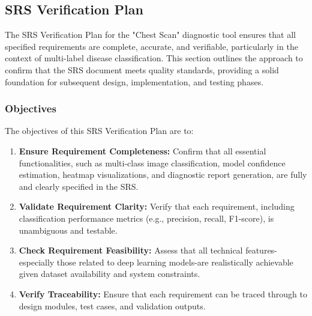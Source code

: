 \documentclass[12pt, titlepage]{article}
\begin{document}
\pagebreak

\subsection{SRS Verification Plan}


The SRS Verification Plan for the "Chest Scan" diagnostic tool ensures that all specified requirements are complete, accurate, and verifiable, particularly in the context of multi-label disease classification. This section outlines the approach to confirm that the SRS document meets quality standards, providing a solid foundation for subsequent design, implementation, and testing phases.

\subsubsection{Objectives}
The objectives of this SRS Verification Plan are to:
\begin{enumerate}
  \item \textbf{Ensure Requirement Completeness:} Confirm that all essential functionalities, such as multi-class image classification, model confidence estimation, heatmap visualizations, and diagnostic report generation, are fully and clearly specified in the SRS.
  \item \textbf{Validate Requirement Clarity:} Verify that each requirement, including classification performance metrics (e.g., precision, recall, F1-score), is unambiguous and testable.
  \item \textbf{Check Requirement Feasibility:} Assess that all technical features-especially those related to deep learning models-are realistically achievable given dataset availability and system constraints.
  \item \textbf{Verify Traceability:} Ensure that each requirement can be traced through to design modules, test cases, and validation outputs.
\end{enumerate}
\end{document}
